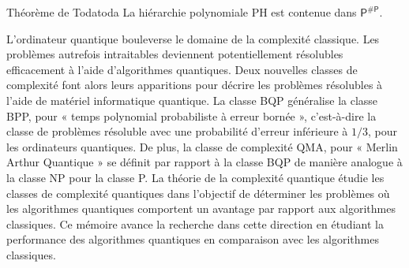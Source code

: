 \begin{subtheorem}{Théorème de Toda}{toda}
    La hiérarchie polynomiale \textsf{PH} est contenue dans $\textsf{P}^{\textsf{\#P}}$.
\end{subtheorem}



L'ordinateur quantique bouleverse le domaine de la complexité classique. Les problèmes autrefois intraitables deviennent potentiellement résolubles efficacement à l'aide d'algorithmes quantiques. Deux nouvelles classes de complexité font alors leurs apparitions pour décrire les problèmes résolubles à l'aide de matériel informatique quantique. La classe \textsf{BQP} généralise la classe \textsf{BPP}, pour « temps polynomial probabiliste à erreur bornée », c'est-à-dire la classe de problèmes résoluble avec une probabilité d'erreur inférieure à $1/3$, pour les ordinateurs quantiques. De plus, la classe de complexité \textsf{QMA}, pour « Merlin Arthur Quantique » se définit par rapport à la classe \textsf{BQP} de manière analogue à la classe \textsf{NP} pour la classe \textsf{P}. La théorie de la complexité quantique étudie les classes de complexité quantiques dans l'objectif de déterminer les problèmes où les algorithmes quantiques comportent un avantage par rapport aux algorithmes classiques. Ce mémoire avance la recherche dans cette direction en étudiant la performance des algorithmes quantiques en comparaison avec les algorithmes classiques.




